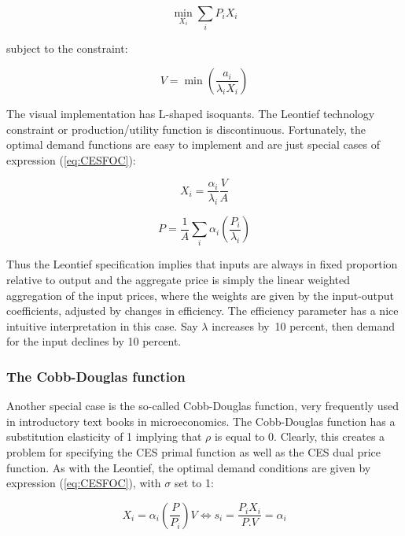 \begin{displaymath}
\min_{X_i}{\sum\limits_i{P_iX_i}}
\end{displaymath}

\noindent subject to the constraint:

\begin{displaymath}
V=\min \left( \frac{{{a}_{i}}}{{{\lambda }_{i}}{{X}_{i}}} \right)
\end{displaymath}

The visual implementation has L-shaped isoquants. The Leontief technology constraint or
production/utility function is discontinuous. Fortunately, the optimal demand functions are easy to
implement and are just special cases of expression (\ref{eq:CESFOC}):

\begin{displaymath}
{{X}_{i}}=\frac{{{\alpha }_{i}}}{{{\lambda }_{i}}}\frac{V}{A}
\end{displaymath}

\begin{displaymath}
P=\frac{1}{A}\sum\limits_{i}{{{\alpha }_{i}}\left( \frac{{{P}_{i}}}{{{\lambda }_{i}}}
\right)}
\end{displaymath}

Thus the Leontief specification implies that inputs are always in fixed proportion relative to
output and the aggregate price is simply the linear weighted aggregation of the input prices, where
the weights are given by the input-output coefficients, adjusted by changes in efficiency. The
efficiency parameter has a nice intuitive interpretation in this case. Say $\lambda$ increases
by~10 percent, then demand for the input declines by 10 percent.

\subsubsection{The Cobb-Douglas function}

Another special case is the so-called Cobb-Douglas function, very frequently used in
introductory text books in microeconomics. The Cobb-Douglas function has a substitution
elasticity of 1 implying that $\rho$ is equal to 0. Clearly, this creates a problem for specifying
the CES primal function as well as the CES dual price function. As with the Leontief, the optimal
demand conditions are given by expression (\ref{eq:CESFOC}), with $\sigma$ set to 1:

\begin{displaymath}
{{X}_{i}}={{\alpha }_{i}}\left( \frac{P}{{{P}_{i}}} \right)V\Leftrightarrow s{{
}_{i}}=\frac{{{P}_{i}}{{X}_{i}}}{P.V}={{\alpha }_{i}}
\end{displaymath}

